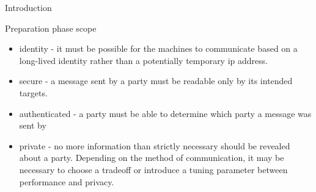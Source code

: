 \begin{frame}{Introduction}
\begin{block}{Preparation phase scope}
\begin{itemize}
  \begin{itemize}
  \tightlist
  \item
    identity - it must be possible for the machines to communicate based
    on a long-lived identity rather than a potentially temporary
    \gls{ip} address.
  \item
    secure - a message sent by a party must be readable only by its
    intended targets.
  \item
    authenticated - a party must be able to determine which party a
    message was sent by
  \item
    private - no more information than strictly necessary should be
    revealed about a party. Depending on the method of communication, it
    may be necessary to choose a tradeoff or introduce a tuning
    parameter between performance and privacy.
  \end{itemize}
\end{itemize}
\end{block}
\end{frame}

